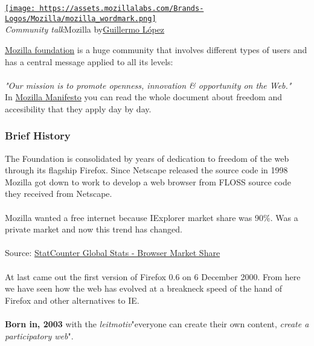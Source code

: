 
\begin{tabular}\href{https://assets.mozillalabs.com/Brands-Logos/Mozilla/mozilla_wordmark.png}{
\texttt{[image: https://assets.mozillalabs.com/Brands-Logos/Mozilla/mozilla\_wordmark.png]}} \\ 
\textit{Community talk}\nolinebreakabout Mozilla by\nolinebreak\href{https://twitter.com/willyaranda}{Guillermo López}
\end{tabular}\href{http://www.mozilla.org/}{Mozilla foundation} is a huge community that involves different types of users and has a central message applied to all its levels:
\\
\\\textit{"Our mission is to promote openness, innovation \& opportunity on the Web."}\textit{
\\} In \href{http://www.mozilla.org/about/manifesto.html}{Mozilla Manifesto} you can read the whole document about freedom and accesibility that they apply day by day.

\subsubsection{ Brief History} The Foundation is consolidated by years of dedication to freedom of the web through its flagship Firefox. Since Netscape released the source code in 1998 Mozilla got down to work to develop a web browser from FLOSS source code they received from Netscape.
\\
\\ Mozilla wanted a free internet because IExplorer market share was 90\%. Was a private market and now this trend has changed.
\\

\\Source: \href{http://gs.statcounter.com/#browser-ww-yearly-2008-2013}{StatCounter Global Stats - Browser Market Share}
\\
\\ At last came out the first version of Firefox 0.6 on 6 December 2000. From here we have seen how the web has evolved at a breakneck speed of the hand of Firefox and other alternatives to IE.
\\
\\\textbf{Born in, 2003} with the \textit{leitmotiv}\nolinebreak"everyone can create their own content, \textit{create a participatory web}".\nolinebreak

